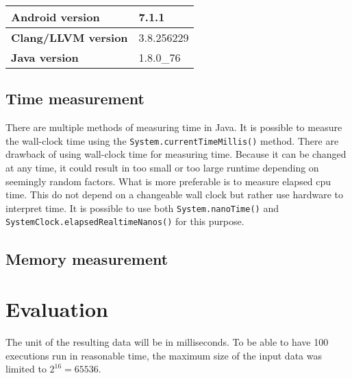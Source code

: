 \begin{table}[H]
    \centering
    \begin{tabular}{|l|l|}
        \hline
        \textbf{Android version} & 7.1.1\\
        \hline
        \textbf{Clang/LLVM version} & 3.8.256229\\
        \hline
        \textbf{Java version} & 1.8.0\_76\\
        \hline
    \end{tabular}
\end{table}


\subsection{Time measurement}
There are multiple methods of measuring time in Java. It is possible to measure the wall-clock time using the \texttt{System.currentTimeMillis()} method. There are drawback of using wall-clock time for measuring time. Because it can be changed at any time, it could result in too small or too large runtime depending on seemingly random factors. What is more preferable is to measure elapsed cpu time. This do not depend on a changeable wall clock but rather use hardware to interpret time. It is possible to use both \texttt{System.nanoTime()} and \texttt{SystemClock.elapsedRealtimeNanos()} for this purpose.

\subsection{Memory measurement}

\section{Evaluation}
The unit of the resulting data will be in milliseconds. To be able to have 100 executions run in reasonable time, the maximum size of the input data was limited to $2^{16} = 65536$. 




